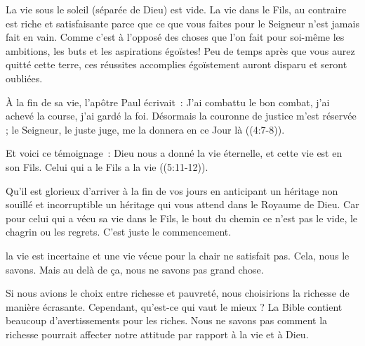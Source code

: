 La vie sous le soleil (séparée de Dieu) est vide.
 La vie dans le Fils, au contraire est riche et satisfaisante
 parce que ce que vous faites pour le Seigneur n'est jamais fait en vain.
 Comme c'est à l'opposé des choses que l'on fait pour soi-même
 \ocadr les ambitions, les buts et les aspirations égoïstes!
 Peu de temps après que vous aurez quitté cette terre,
 ces réussites accomplies égoïstement auront disparu et seront oubliées. 


À la fin de sa vie, l'apôtre Paul écrivait~: 
 \og J'ai combattu le bon combat, j'ai achevé la course, j'ai gardé la foi.
 Désormais la couronne de justice m'est réservée ;
 le Seigneur, le juste juge, me la donnera en ce Jour là \fg{}
 ((4:7-8)). 

Et voici ce témoignage~:
 \og Dieu nous a donné la vie éternelle, et cette vie est en son Fils.
 Celui qui a le Fils a la vie \fg{} ((5:11-12)). 

Qu'il est glorieux d'arriver à la fin de vos jours en anticipant un héritage
 non souillé et incorruptible \ocadr un héritage qui vous attend
 dans le Royaume de Dieu.
 Car pour celui qui a vécu sa vie dans le Fils, le bout du chemin
 ce n'est pas le vide, le chagrin ou les regrets. C'est juste le commencement. 

\dvrule






 la vie est incertaine et une vie vécue
 pour la chair ne satisfait pas. Cela, nous le savons.
 Mais au delà de ça, nous ne savons pas grand chose. 

Si nous avions le choix entre richesse et pauvreté,
 nous choisirions la richesse de manière écrasante.
 Cependant, 
 qu'est-ce qui vaut le mieux ? 
 La Bible contient beaucoup d'avertissements pour les riches.
 Nous ne savons pas comment la richesse pourrait affecter
 notre attitude par rapport à la vie et à Dieu. 

